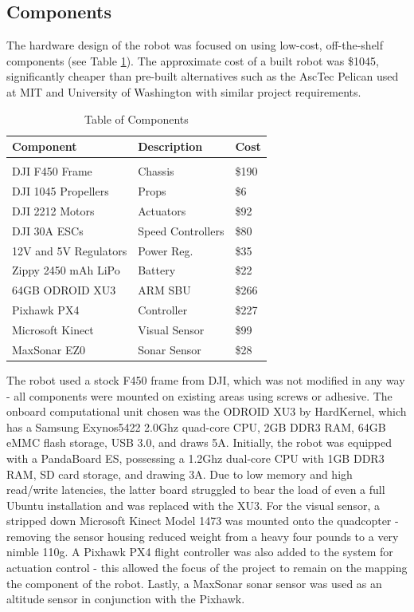 \documentclass[letterpaper, oneside, 10pt]{report}
\begin{document}
\subsection{Components}
The hardware design of the robot was focused on using low-cost, off-the-shelf components (see Table \ref{tbl: components.}). The approximate cost of a built robot was \$1045, significantly cheaper than pre-built alternatives such as the AscTec Pelican used at MIT \cite{bachrach2011range} and University of Washington \cite{bachrach2012estimation} with similar project requirements.

\begin{table}[h!]
  \centering
  \caption{Table of Components}
  \vspace{2mm}
  \begin{tabular}{l l l}
    \hline \hline
    \vspace{-2mm}
    Component & \multicolumn{1}{l}{Description} & \multicolumn{1}{l}{Cost} \\ [1ex]
    \hline
    & \\
    DJI F450 Frame & Chassis & \$190 \\
    DJI 1045 Propellers & Props & \$6 \\
    DJI 2212 Motors & Actuators & \$92 \\
    DJI 30A ESCs & Speed Controllers & \$80 \\
    12V and 5V Regulators & Power Reg. & \$35 \\
    Zippy 2450 mAh LiPo & Battery & \$22 \\
    64GB ODROID XU3 & ARM SBU & \$266 \\
    Pixhawk PX4 & Controller & \$227 \\
    Microsoft Kinect & Visual Sensor & \$99 \\
    MaxSonar EZ0 & Sonar Sensor & \$28 \\
  \end{tabular}
  \label{tbl: components.}
\end{table}

The robot used a stock F450 frame from DJI, which was not modified in any way - all components were mounted on existing areas using screws or adhesive. The onboard computational unit chosen was the ODROID XU3 by HardKernel, which has a Samsung Exynos5422 2.0Ghz quad-core CPU, 2GB DDR3 RAM, 64GB eMMC flash storage, USB 3.0, and draws 5A. Initially, the robot was equipped with a PandaBoard ES, possessing a 1.2Ghz dual-core CPU with 1GB DDR3 RAM, SD card storage, and drawing 3A. Due to low memory and high read/write latencies, the latter board struggled to bear the load of even a full Ubuntu installation and was replaced with the XU3. For the visual sensor, a stripped down Microsoft Kinect Model 1473 was mounted onto the quadcopter - removing the sensor housing reduced weight from a heavy four pounds to a very nimble 110g. A Pixhawk PX4 flight controller was also added to the system for actuation control - this allowed the focus of the project to remain on the mapping the component of the robot. Lastly, a MaxSonar sonar sensor was used as an altitude sensor in conjunction with the Pixhawk.
\end{document}
